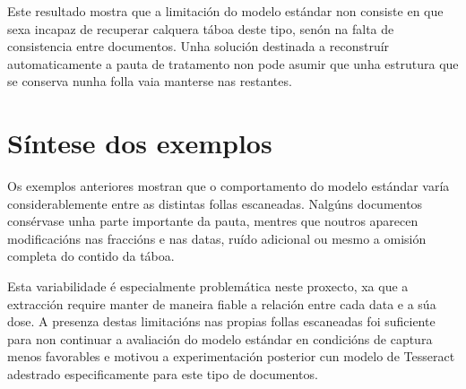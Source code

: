 Este resultado mostra que a limitación do modelo estándar non consiste en que
sexa incapaz de recuperar calquera táboa deste tipo, senón na falta de
consistencia entre documentos. Unha solución destinada a reconstruír
automaticamente a pauta de tratamento non pode asumir que unha estrutura que
se conserva nunha folla vaia manterse nas restantes.


\section{Síntese dos exemplos}
\label{secapd:tesseract-sintese}

Os exemplos anteriores mostran que o comportamento do modelo estándar varía
considerablemente entre as distintas follas escaneadas. Nalgúns documentos
consérvase unha parte importante da pauta, mentres que noutros aparecen
modificacións nas fraccións e nas datas, ruído adicional ou mesmo a omisión
completa do contido da táboa.

Esta variabilidade é especialmente problemática neste proxecto, xa que a
extracción require manter de maneira fiable a relación entre cada data e a súa
dose. A presenza destas limitacións nas propias follas escaneadas foi
suficiente para non continuar a avaliación do modelo estándar en condicións de
captura menos favorables e motivou a experimentación posterior cun modelo de
Tesseract adestrado especificamente para este tipo de documentos.